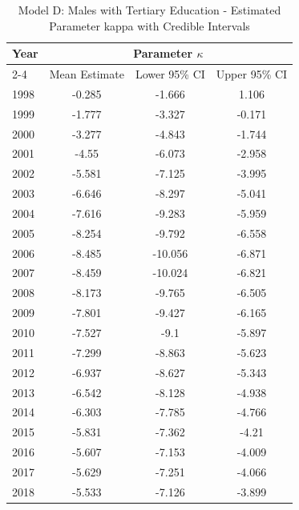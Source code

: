 \begin{landscape}
\begin{table}[htbp]
\centering
\caption{Model D: Males with Tertiary Education - Estimated Parameter kappa  with Credible Intervals}
\label{tab:parameters_k32}
\begin{tabular}{@{}lccc@{}}
\toprule
Year & \multicolumn{3}{c}{Parameter \(\kappa\)} \\
\cmidrule(lr){2-4}
      & Mean Estimate & Lower 95\% CI & Upper 95\% CI \\
\midrule
1998 & -0.285 & -1.666 & 1.106 \\
1999 & -1.777 & -3.327 & -0.171 \\
2000 & -3.277 & -4.843 & -1.744 \\
2001 & -4.55 & -6.073 & -2.958 \\
2002 & -5.581 & -7.125 & -3.995 \\
2003 & -6.646 & -8.297 & -5.041 \\
2004 & -7.616 & -9.283 & -5.959 \\
2005 & -8.254 & -9.792 & -6.558 \\
2006 & -8.485 & -10.056 & -6.871 \\
2007 & -8.459 & -10.024 & -6.821 \\
2008 & -8.173 & -9.765 & -6.505 \\
2009 & -7.801 & -9.427 & -6.165 \\
2010 & -7.527 & -9.1 & -5.897 \\
2011 & -7.299 & -8.863 & -5.623 \\
2012 & -6.937 & -8.627 & -5.343 \\
2013 & -6.542 & -8.128 & -4.938 \\
2014 & -6.303 & -7.785 & -4.766 \\
2015 & -5.831 & -7.362 & -4.21 \\
2016 & -5.607 & -7.153 & -4.009 \\
2017 & -5.629 & -7.251 & -4.066 \\
2018 & -5.533 & -7.126 & -3.899 \\
\bottomrule
\end{tabular}
\end{table}
\end{landscape}